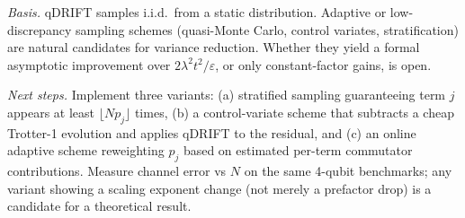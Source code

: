 \begin{enumerate}
    \emph{Basis.} qDRIFT samples i.i.d.\ from a static distribution. Adaptive
    or low-discrepancy sampling schemes (quasi-Monte Carlo, control variates,
    stratification) are natural candidates for variance reduction. Whether
    they yield a formal asymptotic improvement over
    $2 \lambda^2 t^2 / \varepsilon$, or only constant-factor gains, is open.

    \emph{Next steps.} Implement three variants:
    (a) stratified sampling guaranteeing term $j$ appears at least
    $\lfloor N p_j \rfloor$ times,
    (b) a control-variate scheme that subtracts a cheap Trotter-1 evolution
    and applies qDRIFT to the residual, and
    (c) an online adaptive scheme reweighting $p_j$ based on estimated
    per-term commutator contributions.
    Measure channel error vs $N$ on the same 4-qubit benchmarks; any variant
    showing a scaling exponent change (not merely a prefactor drop) is a
    candidate for a theoretical result.
\end{enumerate}
